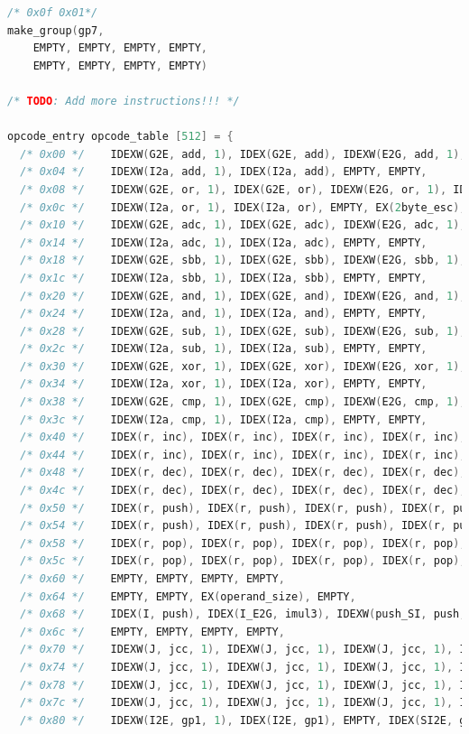 \documentclass[UTF8,a4paper,10pt]{ctexart}
\begin{document}
\begin{itemize}
\begin{lstlisting}[language = C]
  /* 0x0f 0x01*/
make_group(gp7,
    EMPTY, EMPTY, EMPTY, EMPTY,
    EMPTY, EMPTY, EMPTY, EMPTY)

/* TODO: Add more instructions!!! */

opcode_entry opcode_table [512] = {
  /* 0x00 */	IDEXW(G2E, add, 1), IDEX(G2E, add), IDEXW(E2G, add, 1), IDEX(E2G, add),
  /* 0x04 */	IDEXW(I2a, add, 1), IDEX(I2a, add), EMPTY, EMPTY,
  /* 0x08 */	IDEXW(G2E, or, 1), IDEX(G2E, or), IDEXW(E2G, or, 1), IDEX(E2G, or),
  /* 0x0c */	IDEXW(I2a, or, 1), IDEX(I2a, or), EMPTY, EX(2byte_esc),
  /* 0x10 */	IDEXW(G2E, adc, 1), IDEX(G2E, adc), IDEXW(E2G, adc, 1), IDEX(E2G, adc),
  /* 0x14 */	IDEXW(I2a, adc, 1), IDEX(I2a, adc), EMPTY, EMPTY,
  /* 0x18 */	IDEXW(G2E, sbb, 1), IDEX(G2E, sbb), IDEXW(E2G, sbb, 1), IDEX(E2G, sbb),
  /* 0x1c */	IDEXW(I2a, sbb, 1), IDEX(I2a, sbb), EMPTY, EMPTY,
  /* 0x20 */	IDEXW(G2E, and, 1), IDEX(G2E, and), IDEXW(E2G, and, 1), IDEX(E2G, and),
  /* 0x24 */	IDEXW(I2a, and, 1), IDEX(I2a, and), EMPTY, EMPTY,
  /* 0x28 */	IDEXW(G2E, sub, 1), IDEX(G2E, sub), IDEXW(E2G, sub, 1), IDEX(E2G, sub),
  /* 0x2c */	IDEXW(I2a, sub, 1), IDEX(I2a, sub), EMPTY, EMPTY,
  /* 0x30 */	IDEXW(G2E, xor, 1), IDEX(G2E, xor), IDEXW(E2G, xor, 1), IDEX(E2G, xor),
  /* 0x34 */	IDEXW(I2a, xor, 1), IDEX(I2a, xor), EMPTY, EMPTY,
  /* 0x38 */	IDEXW(G2E, cmp, 1), IDEX(G2E, cmp), IDEXW(E2G, cmp, 1), IDEX(E2G, cmp),
  /* 0x3c */	IDEXW(I2a, cmp, 1), IDEX(I2a, cmp), EMPTY, EMPTY,
  /* 0x40 */	IDEX(r, inc), IDEX(r, inc), IDEX(r, inc), IDEX(r, inc),
  /* 0x44 */	IDEX(r, inc), IDEX(r, inc), IDEX(r, inc), IDEX(r, inc),
  /* 0x48 */	IDEX(r, dec), IDEX(r, dec), IDEX(r, dec), IDEX(r, dec),
  /* 0x4c */	IDEX(r, dec), IDEX(r, dec), IDEX(r, dec), IDEX(r, dec),
  /* 0x50 */	IDEX(r, push), IDEX(r, push), IDEX(r, push), IDEX(r, push),
  /* 0x54 */	IDEX(r, push), IDEX(r, push), IDEX(r, push), IDEX(r, push),
  /* 0x58 */	IDEX(r, pop), IDEX(r, pop), IDEX(r, pop), IDEX(r, pop),
  /* 0x5c */	IDEX(r, pop), IDEX(r, pop), IDEX(r, pop), IDEX(r, pop),
  /* 0x60 */	EMPTY, EMPTY, EMPTY, EMPTY,
  /* 0x64 */	EMPTY, EMPTY, EX(operand_size), EMPTY,
  /* 0x68 */	IDEX(I, push), IDEX(I_E2G, imul3), IDEXW(push_SI, push, 1), IDEX(SI_E2G, imul3),
  /* 0x6c */	EMPTY, EMPTY, EMPTY, EMPTY,
  /* 0x70 */	IDEXW(J, jcc, 1), IDEXW(J, jcc, 1), IDEXW(J, jcc, 1), IDEXW(J, jcc, 1),
  /* 0x74 */	IDEXW(J, jcc, 1), IDEXW(J, jcc, 1), IDEXW(J, jcc, 1), IDEXW(J, jcc, 1),
  /* 0x78 */	IDEXW(J, jcc, 1), IDEXW(J, jcc, 1), IDEXW(J, jcc, 1), IDEXW(J, jcc, 1),
  /* 0x7c */	IDEXW(J, jcc, 1), IDEXW(J, jcc, 1), IDEXW(J, jcc, 1), IDEXW(J, jcc, 1),
  /* 0x80 */	IDEXW(I2E, gp1, 1), IDEX(I2E, gp1), EMPTY, IDEX(SI2E, gp1),

\end{lstlisting}
\end{itemize}
\end{document}
